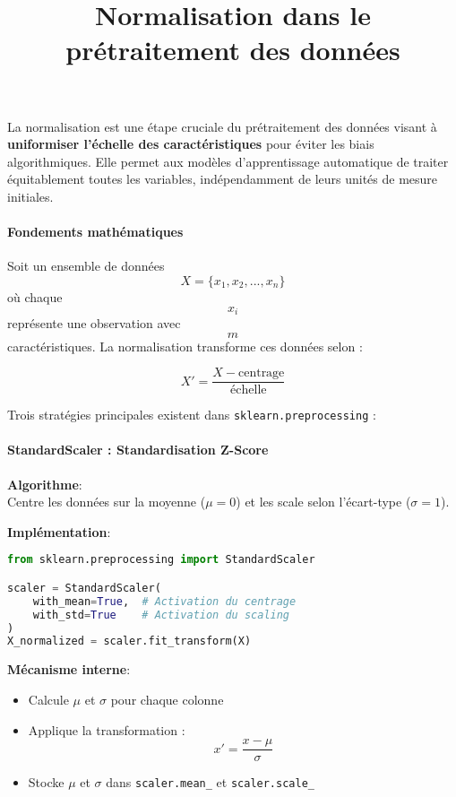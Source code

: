 \documentclass{article}
\title{Normalisation dans le prétraitement des données}
\author{}
\date{}
\begin{document}
\maketitle

La normalisation est une étape cruciale du prétraitement des données visant à \textbf{uniformiser l'échelle des caractéristiques} pour éviter les biais algorithmiques. Elle permet aux modèles d'apprentissage automatique de traiter équitablement toutes les variables, indépendamment de leurs unités de mesure initiales.

\paragraph*{Fondements mathématiques}
Soit un ensemble de données 
\[
X = \{x_1, x_2, ..., x_n\}
\]
où chaque 
\[
x_i
\]
représente une observation avec 
\[
m
\]
caractéristiques. La normalisation transforme ces données selon :

\[
X' = \frac{X - \text{centrage}}{\text{échelle}}
\]

Trois stratégies principales existent dans \texttt{sklearn.preprocessing} :

\paragraph*{StandardScaler : Standardisation Z-Score}

\textbf{Algorithme}: \\
Centre les données sur la moyenne ($\mu=0$) et les scale selon l'écart-type ($\sigma=1$).

\textbf{Implémentation}: \\
\begin{lstlisting}[language=Python]
from sklearn.preprocessing import StandardScaler

scaler = StandardScaler(
    with_mean=True,  # Activation du centrage
    with_std=True    # Activation du scaling
)
X_normalized = scaler.fit_transform(X)
\end{lstlisting}

\textbf{Mécanisme interne}: \\
\begin{itemize}
    \item Calcule $\mu$ et $\sigma$ pour chaque colonne
    \item Applique la transformation :
    \[
    x' = \frac{x - \mu}{\sigma}
    \]
    \item Stocke $\mu$ et $\sigma$ dans \texttt{scaler.mean\_} et \texttt{scaler.scale\_}
\end{itemize}
\end{document}
